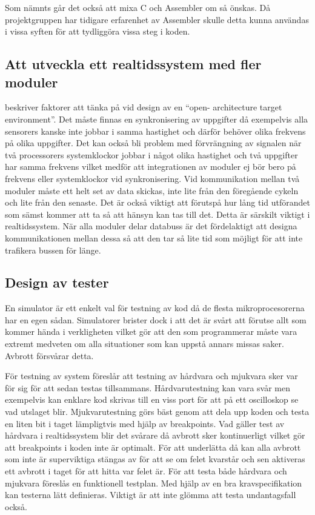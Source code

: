 \documentclass[11pt]{article}
\begin{document}
\begin{flushleft}
Som nämnts går det också att mixa C och Assembler om så önskas. Då projektgruppen har tidigare erfarenhet av Assembler skulle detta kunna användas i vissa syften för att tydliggöra vissa steg i koden. 

\subsection{Att utveckla ett realtidssystem med fler moduler}

\cite{IRS} beskriver faktorer att tänka på vid design av en ``open- architecture target environment''. Det måste finnas en synkronisering av uppgifter då exempelvis alla sensorers kanske inte jobbar i samma hastighet och därför behöver olika frekvens på olika uppgifter. Det kan också bli problem med förvrängning av signalen när två processorers systemklockor jobbar i något olika hastighet och två uppgifter har samma frekvens vilket medför att integrationen av moduler ej bör bero på frekvens eller systemklockor vid synkronisering. Vid kommunikation mellan två moduler måste ett  helt set av data skickas, inte lite från den föregående cykeln och lite från den senaste. Det är också viktigt att förutspå hur lång tid utförandet som sämst kommer att ta så att hänsyn kan tas till det. Detta är särskilt viktigt i realtidssystem. När alla moduler delar databuss är det fördelaktigt att designa kommunikationen mellan dessa så att den tar så lite tid som möjligt för att inte trafikera bussen för länge.   

\subsection{Design av tester}
En simulator är ett enkelt val för testning av kod då de flesta mikroprocesorerna har en egen sådan. Simulatorer brister dock i att det är svårt att förutse allt som kommer hända i verkligheten vilket gör att den som programmerar måste vara extremt medveten om alla situationer som kan uppstå annars missas saker. Avbrott försvårar detta.\cite{RWD}

För testning av system föreslår \cite{RWD} att testning av hårdvara och mjukvara sker var för sig för att sedan testas tillsammans. Hårdvarutestning kan vara svår men exempelvis  kan enklare kod skrivas till en viss port för att på ett oscilloskop se vad utslaget blir. Mjukvarutestning görs bäst genom att dela upp koden och testa en liten bit i taget lämpligtvis med hjälp av breakpoints. Vad gäller test av hårdvara i realtidssystem blir det svårare då avbrott sker kontinuerligt vilket gör att breakpoints i koden inte är optimalt. För att underlätta då kan alla avbrott som inte är superviktiga stängas av för att se om felet kvarstår och sen aktiveras ett avbrott i taget för att hitta var felet är. För att testa både hårdvara och mjukvara föreslås en funktionell testplan. Med hjälp av en bra kravspecifikation kan testerna lätt definieras. Viktigt är att inte glömma att testa undantagsfall också.


\end{flushleft}
\end{document}
